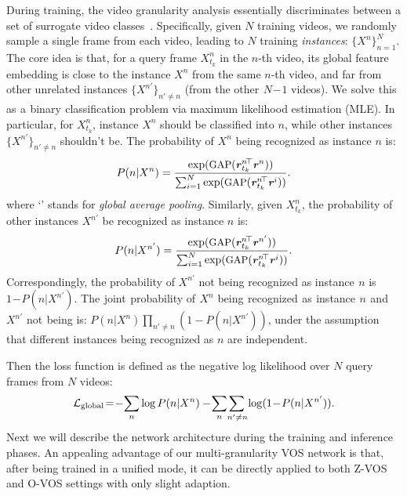 \documentclass[10pt,twocolumn,letterpaper]{article}
\begin{document}
During training, the video granularity analysis essentially discriminates between a set of surrogate video classes~\!\cite{dosovitskiy2014discriminative}. Specifically, given $N$ training videos, we randomly sample a single frame from each video, leading to $N$ training \textit{instances}: $\{X^{n}\}_{n=1}^N$. The core idea is that, for a query frame $X^n_{t_k}$ in the $n$-th video, its global feature embedding is close to the instance $X^{n}$ from the same $n$-th video, and far from other unrelated instances $\{X^{n'}\}_{n'\neq n}$ (from the other$_{\!}$ $N_{\!}\!-_{\!}\!1$ videos). We$_{\!}$ solve$_{\!}$ this$_{\!}$ as$_{\!}$ a$_{\!}$ binary$_{\!}$ classification
problem via maximum likelihood estimation (MLE). In particular, for $X^n_{t_k}$,  instance $X^n$ should be classified into $n$, while other instances $\{X^{n'}\}_{n'\neq n}$ shouldn't be. The probability of
$X^n$ being recognized as instance $n$ is:
\vspace{-3pt}
\begin{equation}\small
P(n|X^n) = \frac{\exp(\text{GAP}(\textbf{\textit{r}}^{n\!\top}_{t_k} \textbf{\textit{r}}^{n}))}{\sum_{i=1}^{N}\exp(\text{GAP}(\textbf{\textit{r}}^{n\!\top}_{t_{k}} \textbf{\textit{r}}^{i}))}.
\vspace{-2pt}
\end{equation}
where `' stands for \textit{global average pooling}. Similarly, given $X^n_{t_k}$, the probability of other instances $X^{n'}$ be recognized as instance $n$ is:
\vspace{-6pt}
\begin{equation}\small
P(n|X^{n'}) = \frac{\exp(\text{GAP}(\textbf{\textit{r}}^{n\!\top}_{t_k} \textbf{\textit{r}}^{n'}))}{\sum_{i=1}^{N}\exp(\text{GAP}(\textbf{\textit{r}}^{n\!\top}_{t_{k}} \textbf{\textit{r}}^{i}))}.
\vspace{-3pt}
\end{equation}
Correspondingly, the probability of $X^{n'\!}$ not being recognized as instance$_{\!}$ $n$ is$_{\!}$ $1_{\!}\!-_{\!}\!P(n|X^{n'\!})$. The$_{\!}$ joint$_{\!}$ probability of$_{\!}$ $X^{n\!}$ being$_{\!}$ recognized$_{\!}$ as$_{\!}$ instance$_{\!}$ $n_{\!}$ and$_{\!}$ $X^{n'\!}$ not$_{\!}$ being is: $P(n|X^{n})\prod_{n'\neq n}(1\!-\!P(n|X^{n'\!}))$, under the assumption that different instances being recognized as $n$ are independent.

Then the loss function is defined as the negative log likelihood over $N$ query frames from $N$ videos:
\vspace{-1pt}
\begin{equation} \small
\mathcal{L}_{\text{global}}\!=\!-\!\sum_n\log P(n|X^{n})-\!\sum_n\!\sum_{n'\neq n\!}\log(1\!-\!P(n|X^{n'})).
\label{equ:MLE}
\vspace{-3pt}
\end{equation}
Next we will describe the network architecture during the training and inference phases. An appealing advantage of our multi-granularity VOS network is that, after being trained in a unified mode, it can be directly applied to both Z-VOS and O-VOS settings with only slight adaption.
\end{document}
